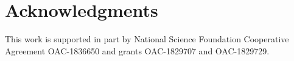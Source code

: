 \documentclass[twocolumn]{svjour3}          %
\begin{document}
\section*{Acknowledgments}

This work is supported in part by National Science Foundation Cooperative Agreement OAC-1836650 and grants OAC-1829707 and OAC-1829729.




%
%
\end{document}
